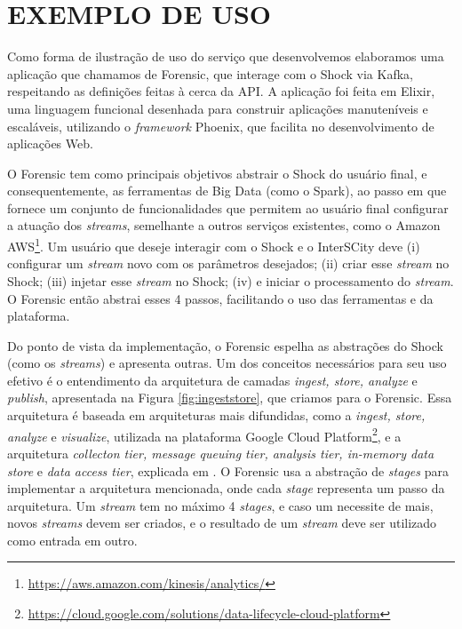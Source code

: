 \chapter[EXEMPLO DE USO]{EXEMPLO DE USO}
\label{chapter:example}

Como forma de ilustração de uso do serviço que desenvolvemos elaboramos uma
aplicação que chamamos de Forensic, que interage com o Shock via Kafka,
respeitando as definições feitas à cerca da API. A aplicação foi feita em
Elixir, uma linguagem funcional desenhada para construir aplicações
manuteníveis e escaláveis, utilizando o \textit{framework} Phoenix, que
facilita no desenvolvimento de aplicações Web.

O Forensic tem como principais objetivos abstrair o Shock do usuário final,
e consequentemente, as ferramentas de Big Data (como o Spark), ao passo em que
fornece um conjunto de funcionalidades que permitem ao usuário final configurar
a atuação dos \textit{streams}, semelhante a outros serviços existentes,
como o Amazon AWS\footnote{\url{https://aws.amazon.com/kinesis/analytics/}}.
Um usuário que deseje interagir com o Shock e o InterSCity deve
(i) configurar um \textit{stream} novo com os
parâmetros desejados; (ii) criar esse \textit{stream} no Shock; (iii) injetar
esse \textit{stream} no Shock; (iv) e iniciar o processamento do
\textit{stream}. O Forensic então abstrai esses 4 passos, facilitando o uso
das ferramentas e da plataforma.

Do ponto de vista da implementação, o Forensic espelha as abstrações do Shock
(como os \textit{streams}) e apresenta outras. Um dos conceitos necessários para seu
uso efetivo é o entendimento da arquitetura de camadas
\textit{ingest, store, analyze} e \textit{publish}, apresentada na Figura
\ref{fig:ingeststore}, que criamos para o Forensic. Essa arquitetura é baseada
em arquiteturas mais difundidas, como a \textit{ingest, store, analyze} e
\textit{visualize}, utilizada na plataforma Google Cloud
Platform\footnote{\url{https://cloud.google.com/solutions/data-lifecycle-cloud-platform}},
e a arquitetura \textit{collecton tier, message queuing tier, analysis tier,
in-memory data store} e \textit{data access tier}, explicada em
. O Forensic usa a abstração de \textit{stages}
para implementar a arquitetura mencionada, onde cada \textit{stage}
representa um passo da arquitetura. Um \textit{stream} tem no máximo
4 \textit{stages}, e caso um necessite de mais, novos \textit{streams} devem
ser criados, e o resultado de um \textit{stream} deve ser utilizado como entrada
em outro.

